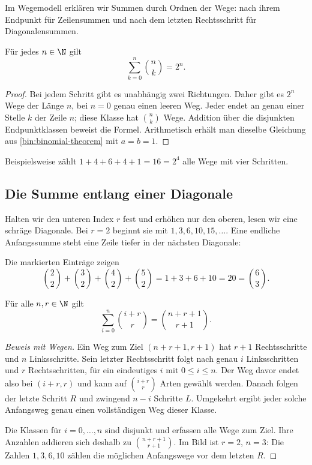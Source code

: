 Im Wegemodell erklären wir Summen durch Ordnen der Wege:
nach ihrem Endpunkt für Zeilensummen und nach dem letzten
Rechtsschritt für Diagonalensummen.

\begin{satz}[Zeilensumme]
Für jedes $n\in\N$ gilt
\begin{equation}\tag{Z}\label{bin:rowsum}
 \sum_{k=0}^n\binom nk=2^n.
\end{equation}
\end{satz}
\begin{proof}
Bei jedem Schritt gibt es unabhängig zwei Richtungen. Daher gibt es
$2^n$ Wege der Länge $n$, bei $n=0$ genau einen leeren Weg.
Jeder endet an genau einer Stelle $k$ der Zeile $n$; diese Klasse hat
$\binom nk$ Wege. Addition über die disjunkten Endpunktklassen beweist
die Formel. Arithmetisch erhält man dieselbe Gleichung aus
\eqref{bin:binomial-theorem} mit $a=b=1$.
\end{proof}

Beispielsweise zählt $1+4+6+4+1=16=2^4$ alle Wege mit vier Schritten.

\subsection*{Die Summe entlang einer Diagonale}

Halten wir den unteren Index $r$ fest und erhöhen nur den oberen,
lesen wir eine schräge Diagonale. Bei $r=2$ beginnt sie mit
$1,3,6,10,15,\ldots$. Eine endliche Anfangssumme steht eine Zeile
tiefer in der nächsten Diagonale:
\begin{center}
\PascalWegeDiagonal
\end{center}
Die markierten Einträge zeigen
\[
 \binom22+\binom32+\binom42+\binom52
 =1+3+6+10=20=\binom63.
\]

\begin{satz}[Diagonalensumme]
Für alle $n,r\in\N$ gilt
\begin{equation}\tag{D}\label{bin:diagonal}
 \boxed{\displaystyle
 \sum_{i=0}^n\binom{i+r}r=\binom{n+r+1}{r+1}.}
\end{equation}
\end{satz}

\begin{proof}[Beweis mit Wegen]
Ein Weg zum Ziel $(n+r+1,r+1)$ hat $r+1$ Rechtsschritte und $n$
Linksschritte. Sein letzter Rechtsschritt folgt nach genau $i$
Linksschritten und $r$ Rechtsschritten, für ein eindeutiges $i$ mit
$0\le i\le n$. Der Weg davor endet also bei $(i+r,r)$ und kann auf
$\binom{i+r}r$ Arten gewählt werden. Danach folgen der letzte Schritt
$R$ und zwingend $n-i$ Schritte $L$. Umgekehrt ergibt jeder solche
Anfangsweg genau einen vollständigen Weg dieser Klasse.

Die Klassen für $i=0,\ldots,n$ sind disjunkt und erfassen alle Wege
zum Ziel. Ihre Anzahlen addieren sich deshalb zu
$\binom{n+r+1}{r+1}$. Im Bild ist $r=2$, $n=3$: Die Zahlen
$1,3,6,10$ zählen die möglichen Anfangswege vor dem letzten $R$.
\end{proof}


